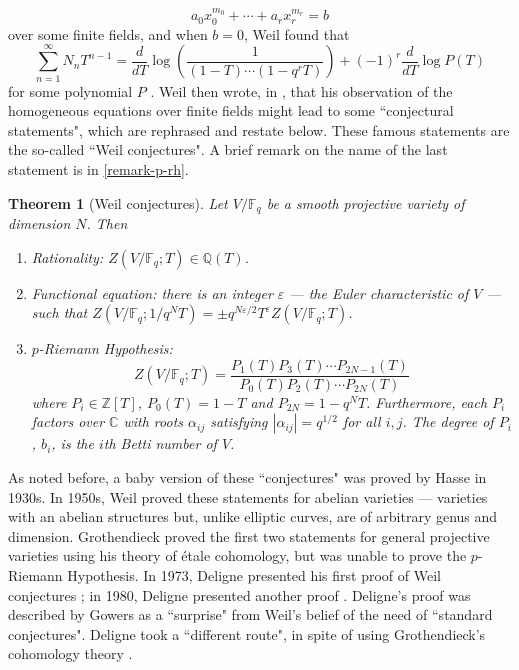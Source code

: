 \documentclass[12pt]{article}
\newtheorem{theorem}{Theorem}[subsection]
\theoremstyle{remark}
\theoremstyle{definition}
\newcommand{\ve}[0]{\varepsilon}
\newcommand{\Z}[0]{\mathbb{Z}}
\newcommand{\F}[0]{\mathbb{F}}
\newcommand{\C}[0]{\mathbb{C}}
\begin{document}
        \[a_0x_0^{m_0}+\cdots+a_rx_r^{m_r}=b\]
        over some finite fields, and when $b=0$, Weil found that
        \[\sum_{n=1}^\infty N_nT^{n-1}=\frac{d}{dT}\log\left(\frac{1}{(1-T)\cdots (1-q^rT)}\right)+(-1)^r\frac{d}{dT}\log P(T)\]
        for some polynomial $P$ \cite{milne_2016_the}. Weil then wrote, in \cite{weil_1949_numbers}, that his observation of the homogeneous equations over finite fields might lead to some ``conjectural statements", which are rephrased and restate below. These famous statements are the so-called ``Weil conjectures". A brief remark on the name of the last statement is in \autoref{remark-p-rh}.
        \begin{theorem}[Weil conjectures]
            Let $V/\F_q$ be a smooth projective variety of dimension $N$. Then
            \begin{enumerate}[\normalfont(i)]
                \item Rationality: $Z(V/\F_q;T)\in\mathbb Q(T)$.
                \item Functional equation: there is an integer $\ve$ --- the Euler characteristic of $V$ --- such that $Z(V/\F_q;1/q^NT)=\pm q^{N\ve/2}T^{\ve}Z(V/\F_q;T)$.
                \item $p$-Riemann Hypothesis:
                \[Z(V/\F_q;T)=\frac{P_1(T)P_3(T)\cdots P_{2N-1}(T)}{P_0(T)P_2(T)\cdots P_{2N}(T)}\]
                where $P_i\in\Z[T]$, $P_0(T)=1-T$ and $P_{2N}=1-q^NT$. Furthermore, each $P_i$ factors over $\C$ with roots $\alpha_{ij}$ satisfying $|\alpha_{ij}|=q^{1/2}$ for all $i, j$. The degree of $P_i$, $b_i$, is the $i$th \textup{Betti number of $V$}. 
            \end{enumerate}
        \end{theorem}
        As noted before, a baby version of these ``conjectures" was proved by Hasse in 1930s. In 1950s, Weil proved these statements for abelian varieties --- varieties with an abelian structures but, unlike elliptic curves, are of arbitrary genus and dimension. Grothendieck proved the first two statements for general projective varieties using his theory of étale cohomology, but was unable to prove the $p$-Riemann Hypothesis. In 1973, Deligne presented his first proof of Weil conjectures \cite{deligne1}; in 1980, Deligne presented another proof \cite{deligne2}. Deligne's proof was described by Gowers as a ``surprise" from Weil's belief of the need of ``standard conjectures". Deligne took a ``different route", in spite of using Grothendieck's cohomology theory \cite{gowers_2013}.
\end{document}
